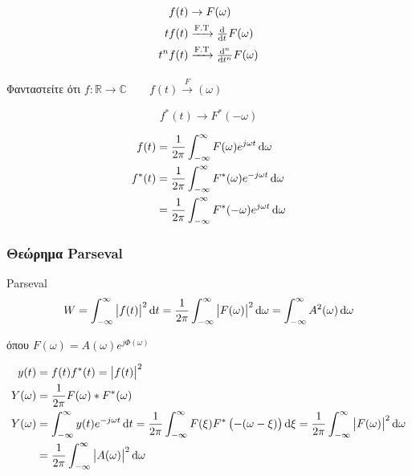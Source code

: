 \documentclass[11pt,a4paper,titlepage,fleqn]{article}
\begin{document}
     \begin{align*}
     f(t)&\to F(\omega )\\
     tf(t)&\xrightarrow{\text{F.T}}\od{}{t} F(\omega )\\
     t^nf(t)&\xrightarrow{\text{F.T}}\od[n]{}{t} F(\omega )\\
     \end{align*}
     
     \paragraph{}
     Φανταστείτε ότι \( f:\mathbb R\to\mathbb C \qquad 
     f(t) \xrightarrow F(\omega )
      \)
     
     \[
     f^*(t) \to F^*(-\omega )
     \]
     
     \begin{align*}
     f(t) &= \frac{1}{2\pi}\int_{-\infty}^{\infty} F(\omega)e^{j\omega t}\dif \omega \\
     f^*(t) &= \frac{1}{2\pi}\int_{-\infty}^{\infty} 
     F^*(\omega)e^{-j\omega t}\dif \omega \\
     &= \frac{1}{2\pi}\int_{-\infty}^{\infty}
     F^*(-\omega )e^{j\omega t}\dif \omega 
     \end{align*}
     
     \subsubsection{Θεώρημα Parseval}
     
     
     \begin{theorem*}[title=Θεώρημα Parseval,width=\textwidth]{Parseval}
     	\begin{align*}
     	W = \int_{-\infty}^{\infty} \left| f(t) \right|^2\dif t
     	=\frac{1}{2\pi}\int_{-\infty}^{\infty} \left|F(\omega )\right|^2
     	\dif \omega = \int_{-\infty}^{\infty} A^2(\omega )\dif \omega 
     	\end{align*}
     	
     	όπου \( \displaystyle F(\omega ) = A(\omega )e^{j\varPhi(\omega )} \)
     \end{theorem*}
     
     \begin{align*}
     y(t) &= f(t)f^*(t)=\left|f(t)\right|^2 \\
     Y(\omega ) &= \frac{1}{2\pi} F(\omega )*F^*(\omega ) \\
     Y(\omega ) &= \int_{-\infty}^{\infty} y(t)e^{-j\omega t}\dif t
     = \frac{1}{2\pi} \int_{-\infty}^{\infty} F(\xi) F^*\left(
     -(\omega -\xi) \right)\dif \xi
     = \frac{1}{2\pi}\int_{-\infty}^{\infty} \left|F(\omega )\right|^2\dif \omega 
     \\ &= \frac{1}{2\pi}\int_{-\infty}^{\infty} \left|A(\omega )\right|^2\dif\omega
     \end{align*}
     
\end{document}
